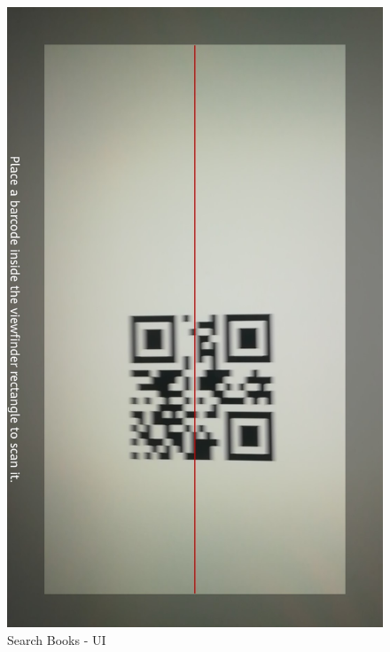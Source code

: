 \begin{figure}[H]
	\hspace{0.5cm}
	\includegraphics[scale=0.15]{Images/UI/Search/2}
	\caption{Search Books - UI}
\end{figure}